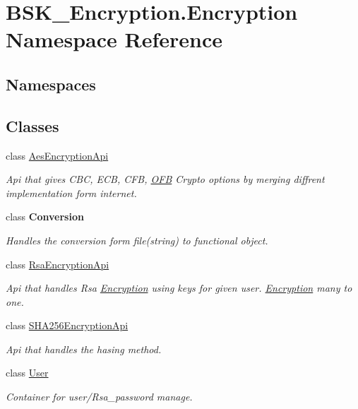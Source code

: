 \hypertarget{namespace_b_s_k___encryption_1_1_encryption}{}\section{B\+S\+K\+\_\+\+Encryption.\+Encryption Namespace Reference}
\label{namespace_b_s_k___encryption_1_1_encryption}
\subsection*{Namespaces}
\begin{DoxyCompactItemize}
\end{DoxyCompactItemize}
\subsection*{Classes}
\begin{DoxyCompactItemize}
\item 
class \mbox{\hyperlink{class_b_s_k___encryption_1_1_encryption_1_1_aes_encryption_api}{Aes\+Encryption\+Api}}
\begin{DoxyCompactList}\small\item\em Api that gives C\+BC, E\+CB, C\+FB, \mbox{\hyperlink{namespace_b_s_k___encryption_1_1_encryption_1_1_o_f_b}{O\+FB}} Crypto options by merging diffrent implementation form internet. \end{DoxyCompactList}\item 
class {\bfseries Conversion}
\begin{DoxyCompactList}\small\item\em Handles the conversion form file(string) to functional object. \end{DoxyCompactList}\item 
class \mbox{\hyperlink{class_b_s_k___encryption_1_1_encryption_1_1_rsa_encryption_api}{Rsa\+Encryption\+Api}}
\begin{DoxyCompactList}\small\item\em Api that handles Rsa \mbox{\hyperlink{namespace_b_s_k___encryption_1_1_encryption}{Encryption}} using keys for given user. \mbox{\hyperlink{namespace_b_s_k___encryption_1_1_encryption}{Encryption}} many to one. \end{DoxyCompactList}\item 
class \mbox{\hyperlink{class_b_s_k___encryption_1_1_encryption_1_1_s_h_a256_encryption_api}{S\+H\+A256\+Encryption\+Api}}
\begin{DoxyCompactList}\small\item\em Api that handles the hasing method. \end{DoxyCompactList}\item 
class \mbox{\hyperlink{class_b_s_k___encryption_1_1_encryption_1_1_user}{User}}
\begin{DoxyCompactList}\small\item\em Container for user/\+Rsa\+\_\+password manage. \end{DoxyCompactList}\end{DoxyCompactItemize}
